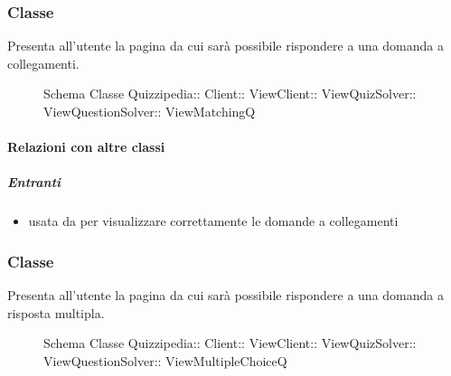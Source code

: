 \subsubsection{Classe }
Presenta all'utente la pagina da cui sarà possibile rispondere a una domanda a collegamenti.
\begin{figure}[H]
\centering
\noindent{}
\caption[Schema Classe ViewMatchingQ]{Schema Classe Quizzipedia:: Client:: ViewClient:: ViewQuizSolver:: ViewQuestionSolver:: ViewMatchingQ}
\end{figure}
\paragraph{Relazioni con altre classi}
\subparagraph{Entranti}
\begin{itemize}
\item usata da  per visualizzare correttamente le domande a collegamenti
\end{itemize}
\subsubsection{Classe }
Presenta all'utente la pagina da cui sarà possibile rispondere a una domanda a risposta multipla.
\begin{figure}[H]
\centering
\noindent{}
\caption[Schema Classe ViewMultipleChoiceQ]{Schema Classe Quizzipedia:: Client:: ViewClient:: ViewQuizSolver:: ViewQuestionSolver:: ViewMultipleChoiceQ}
\end{figure}
